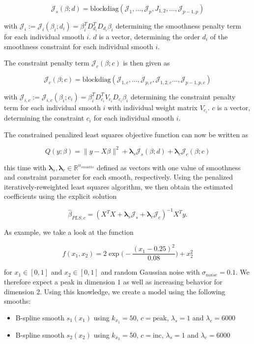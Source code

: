 $$\mathcal J_s(\beta; d) = \text{blockdiag}(\mathcal J_1, \dots, \mathcal J_p, J_{1,2}, \dots, \mathcal J_{p-1,p}) $$

with $\mathcal J_i := \mathcal J_i(\beta_i; d_i) = \beta_i^T D_{d_i}^T D_{d_i} \beta_i$ determining the smoothness penalty term for each individual smooth $i$. $d$ is a vector, determining the order $d_i$ of the smoothness constraint for each individual smooth $i$. 

The constraint penalty term $\mathcal J_c(\beta; c)$ is then given as

$$\mathcal J_c(\beta; c) = \text{blockdiag}(\mathcal J_{1,c}, \dots, \mathcal J_{p,c}, \mathcal J_{1,2,c} \dots, \mathcal J_{p-1,p,c})$$

with $\mathcal J_{i,c} := \mathcal J_{i,c}(\beta_i; c_i) = \beta_i^T D_{c_i}^T V_{c_i} D_{c_i} \beta_i$ determining the constraint penalty term for each individual smooth $i$ with individual weight matrix $V_{c_i}$. $c$ is a vector, determining the constraint $c_i$ for each individual smooth $i$. 

The constrained penalized least squares objective function can now be written as

$$Q(y; \beta) = \lVert y - X\beta \rVert^2 + \boldsymbol \lambda_s \mathcal J_s(\beta; d) + \boldsymbol \lambda_c \mathcal J_c(\beta; c) $$

this time with $\boldsymbol \lambda_s, \boldsymbol \lambda_c \in \mathbb{R}^{n_{smooths}}$  defined as vectors with one value of smoothness and constraint parameter for each smooth, respectively. Using the penalized iteratively-reweighted least squares algorithm, we then obtain the estimated coefficients using the explicit solution

$$\hat \beta_{PLS,c} = (X^TX + \boldsymbol \lambda_s \mathcal J_s  + \boldsymbol \lambda_c \mathcal J_c)^{-1} X^T y.$$

As example, we take a look at the function 

$$f(x_1, x_2) = 2\exp{\big(-\frac{(x_1 - 0.25)^2}{0.08}\big)} + x_2^2 $$

for $x_1 \in [0,1]$ and $x_2 \in [0,1]$ and random Gaussian noise with $\sigma_{noise} = 0.1$. We therefore expect a peak in dimension $1$ as well as increasing behavior for dimension $2$. Using this knowledge, we create a model using the following smooths:

\begin{itemize}
	\item B-spline smooth $s_1(x_1)$ using $k_{x_1} = 50$, $c = \text{peak}$, $\lambda_s = 1$ and $\lambda_c = 6000$
	\item B-spline smooth $s_2(x_2)$ using $k_{x_2} = 50$, $c = \text{inc}$, $\lambda_s = 1$ and $\lambda_c = 6000$
\end{itemize}
	
